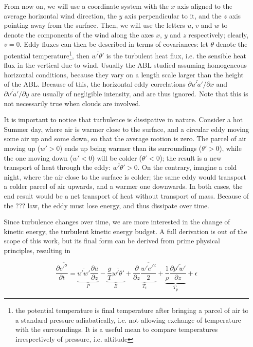 \documentclass[12pt]{book}
\begin{document}
From now on, we will use a coordinate system with the $x$ axis aligned to the average horizontal wind direction, the $y$ axis perpendicular to it, and the $z$ axis pointing away from the surface. Then, we will use the letters $u$, $v$ and $w$ to denote the components of the wind along the axes $x$, $y$ and $z$ respectively; clearly, $\overline{v}=0$. Eddy fluxes can then be described in terms of covariances: let $\theta$ denote the potential temperature\footnote{the potential temperature is final temperature after bringing a parcel of air to a standard pressure adiabatically, i.e. not allowing exchange of temperature with the surroundings. It is a useful mean to compare temperatures irrespectively of pressure, i.e. altitude}, then $\overline{w'\theta'}$ is the turbulent heat flux, i.e. the sensible heat flux in the vertical due to wind. Usually the ABL  studied assuming homogeneous horizontal conditions, because they vary on a length scale larger than the height of the ABL. Because of this, the horizontal eddy correlations $\partial\overline{u'a'}/\partial x$ and $\partial\overline{v'a'}/\partial y$ are usually of negligible intensity, and are thus ignored. Note that this is not necessarily true when clouds are involved.

It is important to notice that turbulence is dissipative in nature. Consider a hot Summer day, where air is warmer close to the surface, and a circular eddy moving some air up and some down, so that the average motion is zero. The parcel of air moving up ($w'>0$) ends up being warmer than its surroundings ($\theta'>0$), while the one moving down ($w'<0$) will be colder ($\theta'<0$); the result is a new transport of heat through the eddy: $\overline{w'\theta'}>0$. On the contrary, imagine a cold night, where the air close to the surface is colder; the same eddy would transport a colder parcel of air upwards, and a warmer one downwards. In both cases, the end result would be a net transport of heat without transport of mass. Because of the ??? law, the eddy must lose energy, and thus dissipate over time.

Since turbulence changes over time, we are more interested in the change of kinetic energy, the turbulent kinetic energy budget. A full derivation is out of the scope of this work, but its final form \cite{basicatm} can be derived from prime physical principles, resulting in

$$
\frac{\partial\overline{{e'}^2}}{\partial t}
=\underbrace{\overline{u'w'}\frac{\partial\overline{u}}{\partial z}}_P
-\underbrace{\frac{g}{T}\overline{w'\theta'}}_B
+\underbrace{\frac{\partial}{\partial z}\frac{\overline{w'{e'}^2}}{2}}_{T_t}
+\underbrace{\frac{1}{\rho}\frac{\partial\overline{p'w'}}{\partial z}}_{T_p}
+\epsilon
$$
\end{document}

